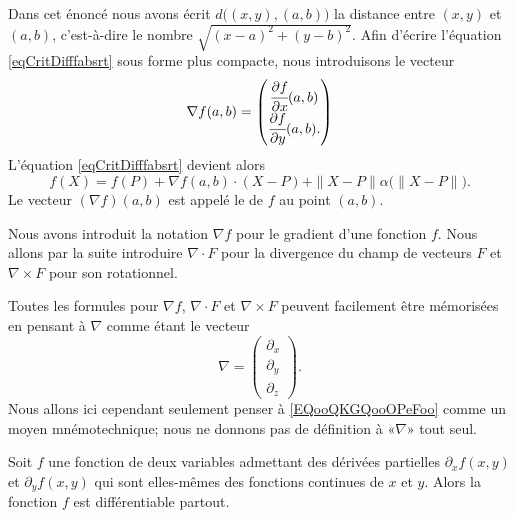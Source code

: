 \begin{normaltext}
	Dans cet énoncé nous avons écrit \( d\big( (x,y),(a,b) \big)\) la distance entre \( (x,y)\) et \( (a,b)\), c'est-à-dire le nombre \( \sqrt{(x-a)^2+(y-b)^2}\). Afin d'écrire l'équation \eqref{eqCritDifffabsrt} sous forme plus compacte, nous introduisons le vecteur
	\begin{equation}
		\nabla f(a,b)=\begin{pmatrix}
			\cfrac{ \partial f }{ \partial x }(a,b) \\
			\cfrac{ \partial f }{ \partial y }(a,b).
		\end{pmatrix}
	\end{equation}
	L'équation \eqref{eqCritDifffabsrt} devient alors
	\begin{equation}        \label{EqdiffComp}
		f(X)=f(P)+\nabla f(a,b)\cdot (X-P)+\| X-P \|\alpha\big( \| X-P \| \big).
	\end{equation}
	Le vecteur \( (\nabla f)(a,b)\) est appelé le  de \( f\) au point \( (a,b)\).
\end{normaltext}

\begin{remark}
	Nous avons introduit la notation \( \nabla f\) pour le gradient d'une fonction \( f\). Nous allons par la suite introduire \( \nabla\cdot F\) pour la divergence du champ de vecteurs \( F\) et \( \nabla\times F\) pour son rotationnel.

	Toutes les formules pour \( \nabla f\), \( \nabla\cdot F\) et \( \nabla\times F\) peuvent facilement être mémorisées en pensant à \( \nabla\) comme étant le vecteur
	\begin{equation}        \label{EQooQKGQooOPeFoo}
		\nabla=\begin{pmatrix}
			\partial_x \\
			\partial_y \\
			\partial_z
		\end{pmatrix}.
	\end{equation}
	Nous allons ici cependant seulement penser à \eqref{EQooQKGQooOPeFoo} comme un moyen mnémotechnique; nous ne donnons pas de définition à «\( \nabla\)» tout seul.
\end{remark}

\begin{proposition} \label{PropExistDiffDeux}
	Soit \( f\) une fonction de deux variables admettant des dérivées partielles \( \partial_xf(x,y)\) et \( \partial_yf(x,y)\) qui sont elles-mêmes des fonctions continues de \( x\) et \( y\). Alors la fonction \( f\) est différentiable partout.
\end{proposition}

